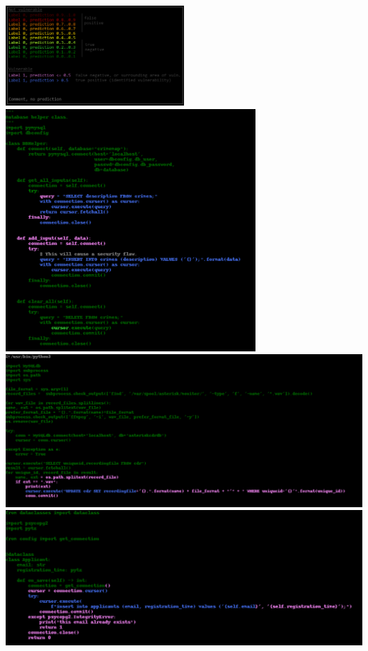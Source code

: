 \documentclass[
a4paper,
pagesize,
pdftex,
12pt,
twoside, %
BCOR=5mm, %
ngerman,
fleqn,
final,
]{scrartcl}
\begin{document}
	\includegraphics[width=0.5\textwidth]{img/Legende}\\
	\includegraphics[width=0.7\textwidth]{img/Example1}\\
	\includegraphics[width=1\textwidth]{img/Example2}\\
	\includegraphics[width=1\textwidth]{img/Example3}
	
\end{document}
